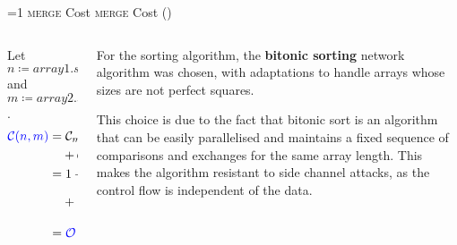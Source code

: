 \setcounter{mergecostcounter}{1}
\newcommand{\mergecostframe}{%
    \ifnum\value{mergecostcounter}=1
        \textsc{merge} Cost%
    \else
        \textsc{merge} Cost (\themergecostcounter)%
    \fi
}
        \begin{frame}{\mergecostframe}
            \begin{columns}[c]
                \begin{column}{0.6\textwidth}
                    Let $n \coloneqq array1.size$ and $m \coloneqq array2.size$.
                    \begin{align*}
                        \textcolor{blue}{\mathcal{C}{\left(n, m\right)}} = & \; \mathcal{C}_{malloc}{\left(n + m\right)} + \mathcal{C}_{memcpy}{\left(n\right)} + \mathcal{C}_{memcpy}{\left(m\right)} + \\
                        & + \mathcal{C}_{sort}{\left(n + m\right)} = \\
                        = & \; 1 + n + m + \\
                        & + \left(\frac{n + m}{2} \cdot \log{\left(n + m\right)} \cdot \frac{\log{\left(n + m\right)} + 1}{2}\right) = \\
                        = & \; \textcolor{blue}{\mathcal{O}{\left(\left(n + m\right) \cdot \left(\log{\left(n  + m\right)}\right)^2\right)}} \\
                    \end{align*}
                \end{column}

                \begin{column}{0.35\textwidth}
                    \small
                    For the sorting algorithm, the \textbf{bitonic sorting} network algorithm was chosen, with adaptations to handle arrays whose sizes are not perfect squares.

                    This choice is due to the fact that bitonic sort is an algorithm that can be easily parallelised and maintains a fixed sequence of comparisons and exchanges for the same array length. This makes the algorithm resistant to side channel attacks, as the control flow is independent of the data.
                \end{column}
            \end{columns}            
        \end{frame}

